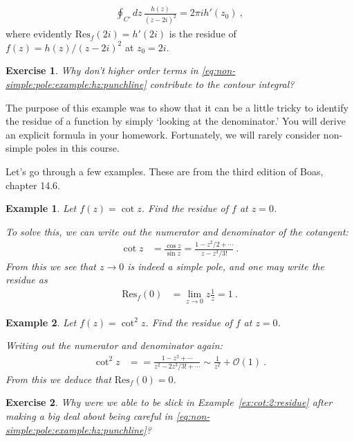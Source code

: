 \documentclass[
  11pt,
	colorful,
	raggedright,
]{tufte-style-thesis-flip}
\newtheorem{exercise}{Exercise}[section]
\newtheorem{example}{Example}[section]
\begin{document}
\begin{align}
  \oint_{C'}dz\, \frac{h(z)}{(z-2i)^2}
  = 2\pi i h'(z_0) \ ,
\end{align}
where evidently $\text{Res}_f(2i)=h'(2i)$ is the residue of $f(z)=h(z)/(z-2i)^2$ at $z_0=2i$. 
\begin{exercise}
Why don't higher order terms in \eqref{eq:non-simple:pole:example:hz:punchline} contribute to the contour integral?
\end{exercise}
The purpose of this example was to show that it can be a little tricky to identify the residue of a function by simply `looking at the denominator.' You will derive an explicit formula in your homework. Fortunately, we will rarely consider non-simple poles in this course. 


Let's go through a few examples. These are from the third edition of Boas, chapter 14.6. 

\begin{example}
Let $f(z)=\cot z$. Find the residue of $f$ at $z=0$. 

To solve this, we can write out the numerator and denominator of the cotangent:
\begin{align}
  \cot z &= \frac{\cos z}{\sin z}
  = \frac{1-z^2/2 + \cdots}{z - z^3/3!} \ .
\end{align}
From this we see that $z\to 0$ is indeed a simple pole, and one may write the residue as
\begin{align}
  \text{Res}_f(0) &= \lim_{z\to 0} z \frac{1}{z} = 1 \ .
\end{align}
\end{example}


\begin{example}\label{ex:cot:2:residue}
Let $f(z)=\cot^2 z$. Find the residue of $f$ at $z=0$. 

Writing out the numerator and denominator again:
\begin{align}
  \cot^2 z &= 
  = \frac{1-z^2 + \cdots}{z^2 - 2z^3/3! + \cdots} 
  \sim \frac{1}{z^2} + \mathcal O(1)
  \ .
\end{align}
From this we deduce that $\text{Res}_f(0) = 0$. 
\end{example}

\begin{exercise}
Why were we able to be slick in Example~\eqref{ex:cot:2:residue} after making a big deal about being careful in \eqref{eq:non-simple:pole:example:hz:punchline}?
\end{exercise}
\end{document}

